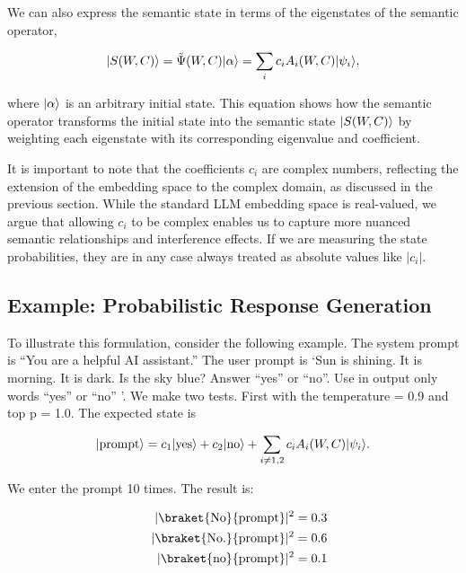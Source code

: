 \documentclass[prd,amsmath,amssymb,12pt]{revtex4}
\DeclarePairedDelimiter\ket{\lvert}{\rangle}
\begin{document}
We can also express the semantic state in terms of the eigenstates of the semantic operator,

\begin{equation}
\ket{S(W, C)} = \tilde{\Psi}(W, C) \ket{\alpha}  = \sum_{i}  c_i A_i(W, C) \ket{\psi_i},
\end{equation}

\noindent
where $\ket{\alpha}$ is an arbitrary initial state. This equation shows how the semantic operator transforms
the initial state into the semantic state $\ket{S(W, C)}$ by weighting each eigenstate with its corresponding
eigenvalue and coefficient.

It is important to note that the coefficients $c_i$ are complex numbers, reflecting the extension of the
embedding space to the complex domain, as discussed in the previous section. While the standard LLM embedding
space is real-valued, we argue that allowing $c_i$ to be complex enables us to capture more nuanced semantic
relationships and interference effects. If we are measuring the state probabilities, they are in any case
always treated as absolute values like $| c_i|$.

\subsection{Example: Probabilistic Response Generation}

To illustrate this formulation, consider the following example. The system prompt is ``You are a helpful AI assistant.''
The user prompt is `Sun is shining. It is morning. It is dark. Is the sky blue? Answer ``yes'' or ``no''.
Use in output only words ``yes'' or ``no'' '. We make two tests. First with the temperature = 0.9 and top p = 1.0.
The expected state is

\begin{equation}
    \ket{\text{prompt}} =
    c_1\ket{\text{yes}} +
    c_2\ket{\text{no}} + \sum_{i\ne 1,2}  c_i A_i(W,C) \ket{\psi_i}.
\end{equation}

\noindent
We enter the prompt 10 times. The result is:

\begin{eqnarray}
    &&|\braket{\text{No}}{\text{prompt}}|^2 =  0.3\\
    &&|\braket{\text{No.}}{\text{prompt}}|^2 = 0.6 \\
    &&|\braket{\text{no}}{\text{prompt}}|^2 = 0.1
\end{eqnarray}
\end{document}
